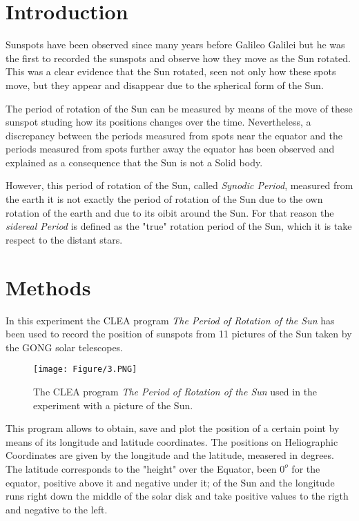\documentclass[twoside]{article}
\begin{document}
	\begin{multicols}{2} %

		\section{Introduction} %

			Sunspots have been observed since many years before Galileo Galilei but he was the first to recorded the sunspots and observe how they move as the Sun rotated. This was a clear evidence that the Sun rotated, seen not only how these spots move, but they appear and disappear due to the spherical form of the Sun.

			The period of rotation of the Sun can be measured by means of the move of these sunspot studing how its positions changes over the time. Nevertheless, a discrepancy between the periods measured from spots near the equator and  the periods measured from spots further away the equator has been observed and explained as a consequence that the Sun is not a Solid body.

			However, this period of rotation of the Sun, called \textit{Synodic Period}, measured from the earth it is not exactly the period of rotation of the Sun due to the own rotation of the earth and due to its oibit around the Sun. For that reason the \textit{sidereal Period} is defined as the "true" rotation period of the Sun, which it is take respect to the distant stars.

		\section{Methods}

			In this experiment the CLEA program \textit{The Period of Rotation of the Sun} has been used to record the position of sunspots from 11 pictures of the Sun taken by the GONG solar telescopes.

				\begin{figure}[H]
					\centering
					\texttt{[image: Figure/3.PNG]}
					\caption{\label{Img:CLEA}The CLEA program \textit{The Period of Rotation of the Sun} used in the experiment with a picture of the Sun.}
				\end{figure}

			This program allows to obtain, save and plot the position of a certain point by means of its longitude and latitude coordinates. The positions on Heliographic Coordinates are given by the longitude and the latitude, measered in degrees. The latitude corresponds to the "height" over the Equator, been $0^o$ for the equator, positive above it and negative under it; of the Sun and the longitude runs right down the middle of the solar disk and take positive values to the rigth and negative to the left.


\end{multicols}
\end{document}
